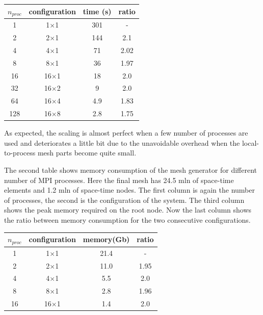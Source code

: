 \documentclass[12pt]{article}
\begin{document}
\begin{center}
\begin{tabular}{|c|c|c|c|}
\hline
$n_{proc}$ & configuration 		& time (s)	& ratio \\
\hline
 1   	   & 1$\times$1 		& 301 		& -		\\
\hline
 2   	   & 2$\times$1 		& 144 		& 2.1	\\
\hline
 4		   & 4$\times$1			& 71  		& 2.02	\\
\hline
 8		   & 8$\times$1			& 36  		& 1.97	\\
\hline
 16		   & 16$\times$1		& 18  		& 2.0	\\
\hline
 32		   & 16$\times$2		& 9   		& 2.0	\\
\hline
 64		   & 16$\times$4		& 4.9 		& 1.83	\\
\hline
 128	   & 16$\times$8		& 2.8 		& 1.75	\\
\hline
\end{tabular}
\end{center}
As expected, the scaling is almost perfect when a few number of processes are used and deteriorates a little bit due to the unavoidable overhead when the local-to-process mesh parts become quite small. 

The second table shows memory consumption of the mesh generator for different number of MPI processes. Here the final mesh has 24.5 mln of space-time elements and 1.2 mln of space-time nodes. The first column is again the number of processes, the second is the configuration of the system. The third column shows the peak memory required on the root node. Now the last column shows the ratio between memory consumption for the two consecutive configurations.

\begin{center}
\begin{tabular}{|c|c|c|c|}
\hline
$n_{proc}$ & configuration   	& memory(Gb) 	& ratio \\
\hline
 1   	   & 1$\times$1 	 	& 21.4 			& -		\\
\hline
 2   	   & 2$\times$1 		& 11.0 			& 1.95	\\
\hline
 4		   & 4$\times$1			& 5.5  			& 2.0	\\
\hline
 8		   & 8$\times$1			& 2.8  			& 1.96	\\
\hline
 16		   & 16$\times$1		& 1.4  			& 2.0	\\
 \hline	
\end{tabular}
\end{center}
\end{document}
